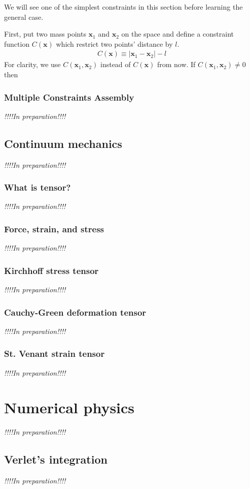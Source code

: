 \documentclass[pdflatex,sn-mathphys-num]{sn-jnl}%
\theoremstyle{thmstyleone}%
\theoremstyle{thmstyletwo}%
\theoremstyle{thmstylethree}%
\newcommand{\inprep}{
	\begin{center}
		\sl\rm {!!!!In preparation!!!!}
\end{center}}
\begin{document}
We will see one of the simplest constraints in this section before learning the general case.

First, put two mass points $\boldsymbol{x}_1$ and $\boldsymbol{x}_2$ on the space and define a constraint function $C(\boldsymbol{x})$ which restrict two points' distance by $l$.
\begin{eqnarray}
	C(\boldsymbol{x}) \equiv | \boldsymbol{x}_1 - \boldsymbol{x}_2 | - l
\end{eqnarray}
For clarity, we use $C(\boldsymbol{x}_1,\boldsymbol{x}_2)$ instead of $C(\boldsymbol{x})$ from now.
If $C(\boldsymbol{x}_1,\boldsymbol{x}_2) \neq 0$ then 

\subsubsection{Multiple Constraints Assembly}

\inprep
\subsection{Continuum mechanics}
\inprep
\subsubsection{What is tensor?}
\inprep
\subsubsection{Force, strain, and stress}
\inprep
\subsubsection{Kirchhoff stress tensor}
\inprep
\subsubsection{Cauchy-Green deformation tensor}
\inprep
\subsubsection{St. Venant strain tensor}
\inprep

\section{Numerical physics}\label{NumPhys}
\inprep
\subsection{Verlet's integration}
\inprep
\end{document}

